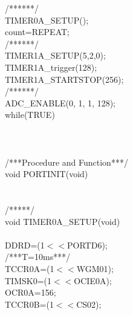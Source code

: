 \documentclass[titlepage, a4paper, 10pt, reqno, openany]{report}
\begin{document}
\begin{minipage}[t]{.35\linewidth}
\hspace*{.5cm}	/******/ \\
\hspace*{.5cm}	TIMER0A\_SETUP(); \\
\hspace*{.5cm}	count=REPEAT; \\
\hspace*{.5cm}	/******/ \\
\hspace*{.5cm}	TIMER1A\_SETUP(5,2,0); \\
\hspace*{.5cm}	TIMER1A\_trigger(128); \\
\hspace*{.5cm}	TIMER1A\_STARTSTOP(256); \\
\hspace*{.5cm}	/******/ \\
\hspace*{.5cm}	ADC\_ENABLE(0, 1, 1, 128); \\
\hspace*{.5cm}    while(TRUE) \\
\hspace*{.5cm}    \textbraceleft \\
\hspace*{.5cm}    \textbraceright \\
\textbraceright \\
/***Procedure and Function***/ \\
void PORTINIT(void) \\
\textbraceleft \\
\textbraceright \\
/*****/ \\
void TIMER0A\_SETUP(void) \\
\textbraceleft \\
\hspace*{.5cm}	DDRD=(1$<<$PORTD6); \\
\hspace*{.5cm}	/***T=10ms***/ \\
\hspace*{.5cm}	TCCR0A=(1$<<$WGM01); \\
\hspace*{.5cm}	TIMSK0=(1$<<$OCIE0A); \\
\hspace*{.5cm}	OCR0A=156; \\
\hspace*{.5cm}	TCCR0B\textbar =(1$<<$CS02); \\
\textbraceright \\

\end{minipage}
\end{document}
